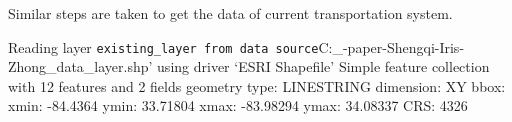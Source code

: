\documentclass[
]{article}
\newenvironment{Shaded}{\begin{snugshade}}{\end{snugshade}}
\newcommand{\DataTypeTok}[1]{\textcolor[rgb]{0.13,0.29,0.53}{#1}}
\newcommand{\DecValTok}[1]{\textcolor[rgb]{0.00,0.00,0.81}{#1}}
\newcommand{\KeywordTok}[1]{\textcolor[rgb]{0.13,0.29,0.53}{\textbf{#1}}}
\newcommand{\NormalTok}[1]{#1}
\newcommand{\OperatorTok}[1]{\textcolor[rgb]{0.81,0.36,0.00}{\textbf{#1}}}
\newcommand{\StringTok}[1]{\textcolor[rgb]{0.31,0.60,0.02}{#1}}
\begin{document}
Similar steps are taken to get the data of current transportation
system.

\begin{Shaded}
\end{Shaded}

Reading layer
\texttt{existing\_layer\textquotesingle{}\ from\ data\ source}C:\Users\iris\_\OneDrive\Desktop\Smith{}\seminar-paper-Shengqi-Iris-Zhong\raw\_data\existing\_layer.shp'
using driver `ESRI Shapefile' Simple feature collection with 12 features
and 2 fields geometry type: LINESTRING dimension: XY bbox: xmin:
-84.4364 ymin: 33.71804 xmax: -83.98294 ymax: 34.08337 CRS: 4326

\begin{Shaded}
\end{Shaded}
\end{document}
